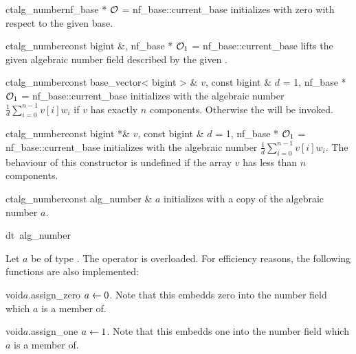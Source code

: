 \begin{fcode}{ct}{alg_number}{nf_base * $\mathcal{O}$ = nf_base::current_base}
  initializes with zero with respect to the given base.
\end{fcode}

\begin{fcode}{ct}{alg_number}{const bigint &, nf_base * $\mathcal{O}_1$ = nf_base::current_base}
  lifts the given  algebraic number field described by the given .
\end{fcode}

\begin{fcode}{ct}{alg_number}{const base_vector< bigint > & $v$, const bigint & $d$ = 1,
    nf_base * $\mathcal{O}_1$ = nf_base::current_base}%
  initializes with the algebraic number $\frac{1}{d} \sum_{i=0}^{n-1} v[i] w_i$ if $v$ has
  exactly $n$ components.  Otherwise the \LEH will be invoked.
\end{fcode}

\begin{fcode}{ct}{alg_number}{const bigint *& $v$, const bigint & $d$ = 1,
    nf_base * $\mathcal{O}_1$ = nf_base::current_base}%
  initializes with the algebraic number $\frac{1}{d} \sum_{i=0}^{n-1} v[i] w_i$.  The behaviour
  of this constructor is undefined if the array $v$ has less than $n$ components.
\end{fcode}

\begin{fcode}{ct}{alg_number}{const alg_number & $a$}
  initializes with a copy of the algebraic number $a$.
\end{fcode}

\begin{fcode}{dt}{~alg_number}{}
\end{fcode}



\ASGN

Let $a$ be of type .  The operator \code{=} is overloaded.  For efficiency
reasons, the following functions are also implemented:

\begin{fcode}{void}{$a$.assign_zero}{}
  $a \leftarrow 0$.  Note that this embedds zero into the number field which $a$ is a member of.
\end{fcode}

\begin{fcode}{void}{$a$.assign_one}{}
  $a \leftarrow 1$.  Note that this embedds one into the number field which $a$ is a member of.
\end{fcode}

